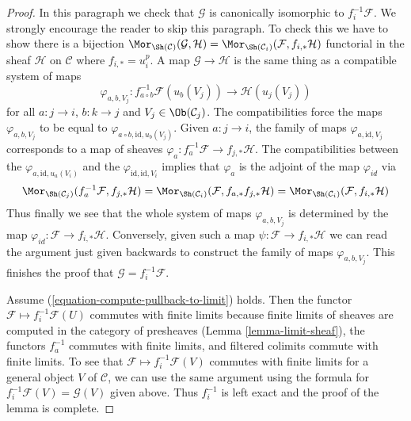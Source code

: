 \begin{proof}
\medskip\noindent
In this paragraph we check that $\mathcal{G}$ is canonically isomorphic to
$f_i^{-1}\mathcal{F}$. We strongly encourage the reader to skip this paragraph.
To check this we have to show there is a bijection
$\Mor_{\Sh(\mathcal{C})}(\mathcal{G}, \mathcal{H}) =
\Mor_{\Sh(\mathcal{C}_i)}(\mathcal{F}, f_{i, *}\mathcal{H})$
functorial in the sheaf $\mathcal{H}$ on $\mathcal{C}$
where $f_{i, *} = u_i^p$. A map
$\mathcal{G} \to \mathcal{H}$ is the same thing as a compatible
system of maps
$$
\varphi_{a, b, V_j} :
f_{a \circ b}^{-1}\mathcal{F}(u_b(V_j))
\longrightarrow
\mathcal{H}(u_j(V_j))
$$
for all $a : j \to i$, $b : k \to j$ and $V_j \in \Ob(\mathcal{C}_j)$.
The compatibilities force the maps $\varphi_{a, b, V_j}$ to be equal
to $\varphi_{a \circ b, \text{id}, u_b(V_j)}$. Given $a : j \to i$, the
family of maps $\varphi_{a, \text{id}, V_j}$ corresponds to a map
of sheaves $\varphi_a : f_a^{-1}\mathcal{F} \to f_{j, *}\mathcal{H}$.
The compatibilities between the $\varphi_{a, \text{id}, u_a(V_i)}$
and the $\varphi_{\text{id}, \text{id}, V_i}$ implies that $\varphi_a$
is the adjoint of the map $\varphi_{id}$ via
$$
\Mor_{\Sh(\mathcal{C}_j)}(f_a^{-1}\mathcal{F}, f_{j, *}\mathcal{H}) =
\Mor_{\Sh(\mathcal{C}_i)}(\mathcal{F}, f_{a, *}f_{j, *}\mathcal{H}) =
\Mor_{\Sh(\mathcal{C}_i)}(\mathcal{F}, f_{i, *}\mathcal{H})
$$
Thus finally we see that the whole system of maps $\varphi_{a, b, V_j}$
is determined by the map $\varphi_{id} : \mathcal{F} \to f_{i, *}\mathcal{H}$.
Conversely, given such a map $\psi : \mathcal{F} \to f_{i, *}\mathcal{H}$
we can read the argument just given backwards to construct the family
of maps $\varphi_{a, b, V_j}$. This finishes the proof that
$\mathcal{G} = f_i^{-1}\mathcal{F}$.

\medskip\noindent
Assume (\ref{equation-compute-pullback-to-limit}) holds. Then the functor
$\mathcal{F} \mapsto f_i^{-1}\mathcal{F}(U)$ commutes with finite limits
because finite limits of sheaves are computed in the category of presheaves
(Lemma \ref{lemma-limit-sheaf}), the functors $f_a^{-1}$ commutes with finite
limits, and filtered colimits commute with finite limits. To see that
$\mathcal{F} \mapsto f_i^{-1}\mathcal{F}(V)$ commutes with finite limits
for a general object $V$ of $\mathcal{C}$, we can use the same argument using
the formula for $f_i^{-1}\mathcal{F}(V) = \mathcal{G}(V)$ given above.
Thus $f_i^{-1}$ is left exact and the proof of the lemma is complete.
\end{proof}

